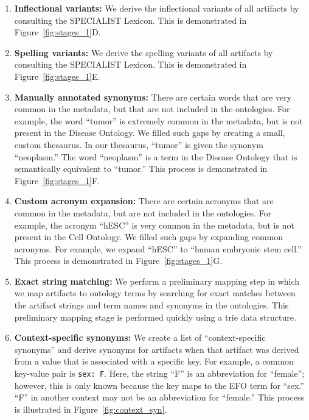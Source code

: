 \begin{enumerate}
\item \textbf{Inflectional variants:} We derive the inflectional variants of all artifacts by consulting the SPECIALIST Lexicon. This is demonstrated in Figure~\ref{fig:stages_1}D.

\item \textbf{Spelling variants:} We derive the spelling variants of all artifacts by consulting the SPECIALIST Lexicon. This is demonstrated in Figure~\ref{fig:stages_1}E.

\item \textbf{Manually annotated synonyms:} There are certain words that are very common in the metadata, but that are not included in the ontologies. For example, the word ``tumor'' is extremely common in the metadata, but is not present in the Disease Ontology. We filled such gaps by creating a small, custom thesaurus.  In our thesaurus, ``tumor'' is given the synonym ``neoplasm.'' The word ``neoplasm'' is a term in the Disease Ontology that is semantically equivalent to ``tumor.''  This process is demonstrated in Figure~\ref{fig:stages_1}F.

\item \textbf{Custom acronym expansion:} There are certain acronyms that are common in the metadata, but are not included in the ontologies. For example, the acronym ``hESC'' is very common in the metadata, but is not present in the Cell Ontology.  We filled such gaps by expanding common acronyms. For example, we expand ``hESC'' to ``human embryonic stem cell.'' This process is demonstrated in Figure~\ref{fig:stages_1}G.  

\item \textbf{Exact string matching:} We perform a preliminary mapping step in which we map artifacts to ontology terms by searching for exact matches between the artifact strings and term names and synonyms in the ontologies. This preliminary mapping stage is performed quickly using a trie data structure.

\item \textbf{Context-specific synonyms:}  We create a list of ``context-specific synonyms'' and derive synonyms for artifacts when that artifact was derived from a value that is associated with a specific key. For example, a common key-value pair is \texttt{sex: F}.  Here, the string ``F'' is an abbreviation for ``female''; however, this is only known because the key maps to the EFO term for ``sex.'' ``F'' in another context may not be an abbreviation for ``female.'' This process is illustrated in Figure~\ref{fig:context_syn}.  


\end{enumerate}
